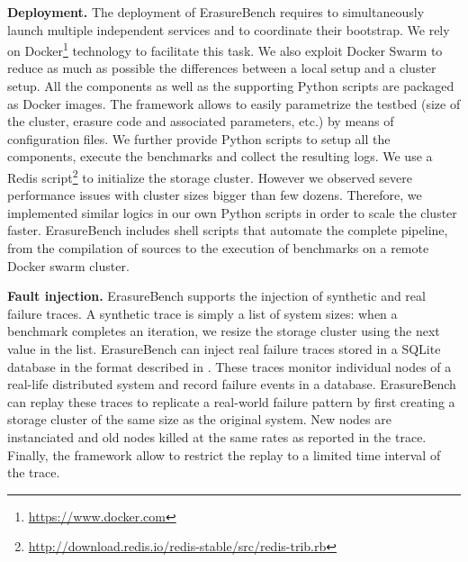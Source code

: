 \textbf{Deployment.} The deployment of ErasureBench requires to simultaneously launch multiple independent services and to coordinate their bootstrap. 
We rely on Docker\footnote{\url{https://www.docker.com}} technology to facilitate this task.
We also exploit Docker Swarm to reduce as much as possible the differences between a local setup and a cluster setup. %
All the components as well as the supporting Python scripts are packaged as Docker images.
The framework allows to easily parametrize the testbed (size of the cluster, erasure code and associated parameters, etc.) by means of configuration files. 
We further provide Python scripts to setup all the components, execute the benchmarks and collect the resulting logs.
We use a Redis script\footnote{\url{http://download.redis.io/redis-stable/src/redis-trib.rb}} to initialize the storage cluster.
However we observed severe performance issues with cluster sizes bigger than few dozens.
Therefore, we implemented similar logics in our own Python scripts in order to scale the cluster faster.
ErasureBench includes shell scripts that automate the complete pipeline, from the compilation of sources to the execution of benchmarks on a remote Docker swarm cluster.

\textbf{Fault injection.}
ErasureBench supports the injection of synthetic and real failure traces. 
A synthetic trace is simply a list of system sizes: when a benchmark completes an iteration, we resize the storage cluster using the next value in the list. 
ErasureBench can inject real failure traces stored in a SQLite database in the format described in \autocite{fta-journal}. 
These traces monitor individual nodes of a real-life distributed system and record failure events in a database. 
ErasureBench can replay these traces to replicate a real-world failure pattern by first creating a storage cluster of the same size as the original system. 
New nodes are instanciated and old nodes killed at the same rates as reported in the trace. 
Finally, the framework allow to restrict the replay to a limited time interval of the trace.
